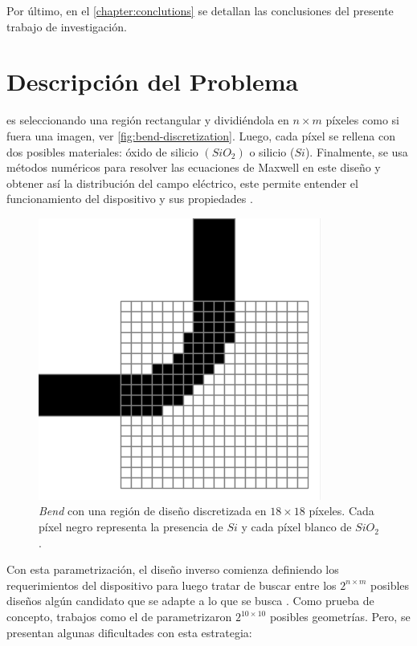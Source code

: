 Por último, en el \autoref{chapter:conclutions} se detallan las conclusiones del presente trabajo de investigación.

\section{Descripción del Problema}

 es seleccionando una región rectangular y dividiéndola
en $n \times m$ píxeles como si fuera una imagen, ver \autoref{fig:bend-discretization}.
Luego, cada píxel se rellena con dos posibles materiales: óxido de silicio $(SiO_2)$ o silicio ($Si$).
Finalmente, se usa métodos numéricos para resolver las ecuaciones de Maxwell en este diseño
y obtener así la distribución del campo eléctrico, este permite entender el funcionamiento del dispositivo
y sus propiedades \citep{Molesky2018, Schneider2019}.

\begin{figure}[ht]
  \centering
  \includegraphics[scale=0.6]{image/introduction/bend-discretization.png}
  \caption{\emph{Bend} con una región de diseño discretizada en $18 \times 18$
  píxeles. Cada píxel negro representa la presencia de $Si$ y cada píxel blanco
  de $SiO_2$.}
  \label{fig:bend-discretization}
\end{figure}

Con esta parametrización, el diseño inverso comienza definiendo los requerimientos del dispositivo para luego tratar de buscar entre los $2^{n \times m}$ posibles diseños algún candidato que se adapte a lo que se busca \citep{Su2020, Molesky2018}.
Como prueba de concepto, trabajos como el de \cite{Malheiros-Silveira2020} parametrizaron $2^{10 \times 10}$ posibles geometrías.
Pero, se presentan algunas dificultades con esta estrategia:

